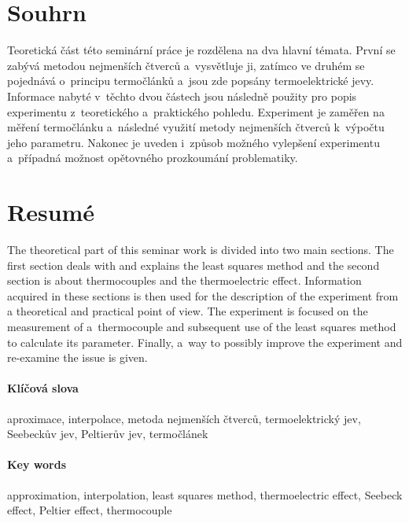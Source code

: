 \section[Souhrn (Resumé)]{Souhrn}
Teoretická část této seminární práce je rozdělena na dva hlavní témata.
První se zabývá metodou nejmenších čtverců a~vysvětluje ji, zatímco ve
druhém se pojednává o~principu termočlánků a~jsou zde popsány termoelektrické
jevy. Informace nabyté v~těchto dvou částech jsou následně použity pro popis
experimentu z~teoretického a~praktického pohledu. Experiment je zaměřen na
měření termočlánku a~následné využití metody nejmenších čtverců k~výpočtu jeho
parametru. Nakonec je uveden i~způsob možného vylepšení experimentu a~případná
možnost opětovného prozkoumání problematiky.

\section*{Resumé}
The theoretical part of this seminar work is divided into two main sections. The first
section deals with and explains the least squares method and the second section is
about thermocouples and the thermoelectric effect. Information acquired in these
sections is then used for the description of the experiment from a theoretical and
practical point of view. The experiment is focused on the measurement of
a~thermocouple and subsequent use of the least squares method to calculate its
parameter. Finally, a~way to possibly improve the experiment and re-examine the
issue is given.



\paragraph{Klíčová slova}
aproximace, interpolace, metoda nejmenších čtverců, termoelektrický jev, 
Seebeckův jev, Peltierův jev, termočlánek

\paragraph{Key words}
approximation, interpolation, least squares method, thermoelectric effect, 
Seebeck effect, Peltier effect, thermocouple

